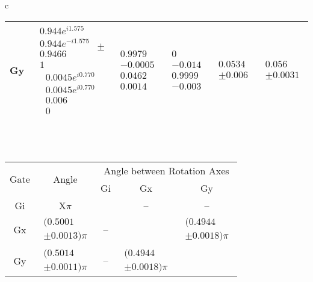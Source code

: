 \documentclass{beamer}
\begin{document}
\begin{frame}
\begin{table}[h]
\begin{center}
{\begin{tabular}{c}
\begin{tabular}[l]{|c|c|c|c|c|c|}
Gy & $ \begin{array}{c}
0.944e^{i1.575} \\ 
0.944e^{-i1.575} \\ 
0.9466 \\ 
1
 \end{array} $
 $\pm$ $ \begin{array}{c}
0.0045e^{i0.770} \\ 
0.0045e^{i0.770} \\ 
0.006 \\ 
0
 \end{array} $
 & $ \begin{array}{c}
0.9979 \\ 
-0.0005 \\ 
0.0462 \\ 
0.0014
 \end{array} $
 & $ \begin{array}{c}
0 \\ 
-0.014 \\ 
0.9999 \\ 
-0.003
 \end{array} $
 & $ \begin{array}{c} 0.0534 \\ \pm 0.006 \end{array} $ & $ \begin{array}{c} 0.056 \\ \pm 0.0031 \end{array} $ \\ \hline
\end{tabular}

\\
\vspace{2em}
\\
\begin{tabular}[l]{|c|c|c|c|c|}
\hline
\multirow{2}{*}{Gate} & \multirow{2}{*}{Angle} & \multicolumn{3}{c|}{Angle between Rotation Axes} \\ \cline{3-5}
 & & Gi & Gx & Gy \\ \hline
Gi & X$\pi$ &  & -- & -- \\ \hline
Gx & $ \begin{array}{c}(0.5001 \\ \pm 0.0013)\pi \end{array} $ & -- &  & $ \begin{array}{c}(0.4944 \\ \pm 0.0018)\pi \end{array} $ \\ \hline
Gy & $ \begin{array}{c}(0.5014 \\ \pm 0.0011)\pi \end{array} $ & -- & $ \begin{array}{c}(0.4944 \\ \pm 0.0018)\pi \end{array} $ &  \\ \hline
\end{tabular}


\end{tabular}}
\end{center}
\end{table}
\end{frame}
\end{document}
